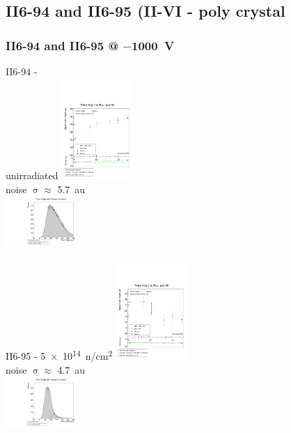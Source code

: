 \documentclass[9pt]{beamer}
\begin{document}
\subsection{II6-94 and II6-95 (II-VI - poly crystal}
\begin{frame}
	\frametitle{II6-94 and II6-95 @ $-$\SI{1000}{V}}
	\centering
	\begin{minipage}{2.7cm}
		\centering
		II6-94 - \\unirradiated
		\includegraphics[width=2.7cm]{CPH1608_14_1}\\
		noise $\upsigma\approx$ \SI{5.7}{au}\\
		\includegraphics[angle=270, width=2.7cm]{SD698}
	\end{minipage}
	\hspace*{2pt}
	\begin{minipage}{2.7cm}
		\centering
		II6-95 - \SI[exponent-product = \cdot]{5e14}{n/cm^{2}}
		\includegraphics[width=2.7cm]{CPH1608_09_1}\\
		noise $\upsigma\approx$ \SI{4.7}{au}\\
		\includegraphics[angle=270, width=2.7cm]{SD555_2}
	\end{minipage}
\end{frame}
\end{document}
